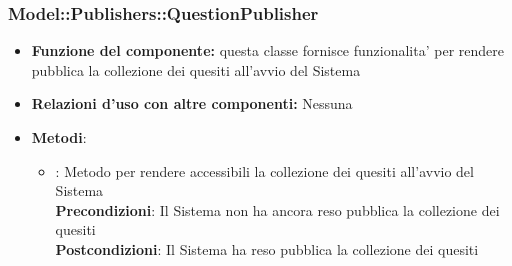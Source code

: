 \subsubsection{Model::Publishers::QuestionPublisher}
\begin{itemize}
\item\textbf{Funzione del componente:} questa classe fornisce funzionalita' per rendere pubblica la collezione dei quesiti all'avvio del Sistema
\item\textbf{Relazioni d'uso con altre componenti:} Nessuna \\
\item\textbf{Metodi}:
	\begin{itemize}
		\item{} : Metodo per rendere accessibili la collezione dei quesiti all'avvio del Sistema\\
		\textbf{Precondizioni}: Il Sistema non ha ancora reso pubblica la collezione dei quesiti\\
		\textbf{Postcondizioni}: Il Sistema ha reso pubblica la collezione dei quesiti\\
	\end{itemize}
\end{itemize}